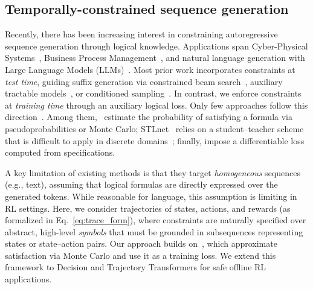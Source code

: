 \subsection{Temporally-constrained sequence generation}

Recently, there has been increasing interest in constraining autoregressive sequence generation through logical knowledge. Applications span Cyber-Physical Systems~\cite{STLnet}, Business Process Management~\cite{UmiliPMAI24,DiFrancescomarino17}, and natural language generation with Large Language Models (LLMs)~\cite{trident,llm_beam_search_1,llm_beam_search_2,llm_sampling1,montecarlo_llm,pseudosemantic_loss}.
%
Most prior work incorporates constraints at \emph{test time}, guiding suffix generation via constrained beam search~\cite{DiFrancescomarino17,trident,llm_beam_search_1,llm_beam_search_2}, auxiliary tractable models~\cite{llm_aux_mod_1,llm_aux_mod_2}, or conditioned sampling~\cite{llm_sampling1,montecarlo_llm}.
%
In contrast, we enforce constraints at \emph{training time} through an auxiliary logical loss. Only few approaches follow this direction~\cite{STLnet,UmiliPMAI24,pseudosemantic_loss,innes2020elaborating}. Among them,~\cite{UmiliPMAI24,pseudosemantic_loss} estimate the probability of satisfying a formula via pseudoprobabilities or Monte Carlo; STLnet~\cite{STLnet} relies on a student–teacher scheme that is difficult to apply in discrete domains~\cite{UmiliPMAI24}; finally, \cite{innes2020elaborating} impose a differentiable loss computed from \ltl specifications.

A key limitation of existing methods is that they target \emph{homogeneous} sequences (e.g., text), assuming that logical formulas are directly expressed over the generated tokens. While reasonable for language, this assumption is limiting in RL settings.
Here, we consider trajectories of states, actions, and rewards (as formalized in Eq.~\ref{eq:trace_form}), where constraints are naturally specified over abstract, high-level \emph{symbols} that must be grounded in subsequences representing states or state–action pairs.
%
Our approach builds on~\cite{UmiliPMAI24,mezini2025neuro}, which approximate \ltlf satisfaction via Monte Carlo and use it as a training loss. We extend this framework to Decision and Trajectory Transformers for safe offline RL applications.

